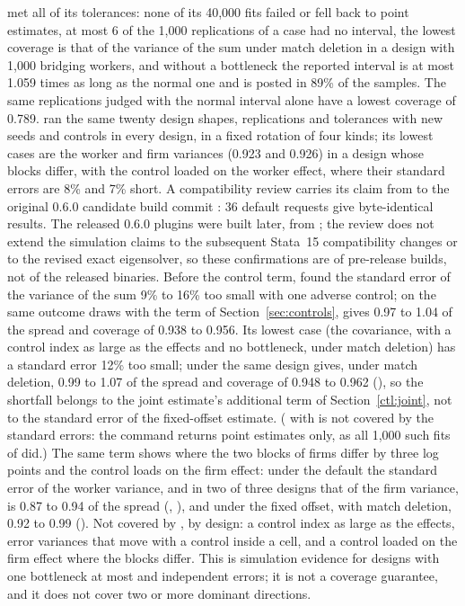  met all of its tolerances: none of its 40{,}000 fits failed or fell back to point estimates, at most 6
of the 1{,}000 replications of a case had no interval, the lowest coverage is that of the variance of the sum under
match deletion in a design with 1{,}000 bridging workers, and without a bottleneck the reported interval is at most
1.059 times as long as the normal one and  is posted in 89\% of the samples. The same replications
judged with the normal interval alone have a lowest coverage of 0.789.  ran the same twenty
design shapes, replications and tolerances with new seeds and controls in every design, in a fixed rotation of
four kinds; its lowest cases are the worker and firm variances (0.923 and 0.926) in a design whose blocks differ,
with the control loaded on the worker effect, where their standard errors are 8\% and 7\% short. A compatibility
review carries its claim from  to the original 0.6.0 candidate build commit : 36
default requests give byte-identical results. The released 0.6.0 plugins were built later, from ;
the review does not extend the simulation claims to the subsequent Stata~15 compatibility changes or to the
revised exact eigensolver, so these confirmations are of pre-release builds, not of the released binaries. Before the control term,  found the standard error of the variance of
the sum 9\% to 16\% too small with one adverse control; on the same outcome draws with the term of
Section~\ref{sec:controls},  gives 0.97 to 1.04 of the spread and coverage of 0.938 to 0.956.
Its lowest case (the covariance, with a control index as large as the effects and no bottleneck, under match
deletion) has a standard error 12\% too small; under  the same design gives, under
match deletion, 0.99 to 1.07 of the spread and coverage of 0.948 to 0.962 (), so the
shortfall belongs to the joint estimate's additional term of Section~\ref{ctl:joint}, not to the standard error of
the fixed-offset estimate. ( with  is not covered by the
standard errors: the command returns point estimates only, as all 1{,}000 such fits of 
did.) The same term shows where the two blocks of firms differ by three log points and the control loads on the
firm effect: under the default the standard error of the worker variance, and in two of three designs that of the
firm variance, is 0.87 to 0.94 of the spread (, ), and under the fixed offset,
with match deletion, 0.92 to 0.99 (). Not covered by
, by design: a control index as large as the effects, error variances that move with a
control inside a cell, and a control loaded on the firm effect where the blocks differ. This is simulation
evidence for designs with one bottleneck at most and independent errors; it is not a coverage guarantee, and it
does not cover two or more dominant directions.
